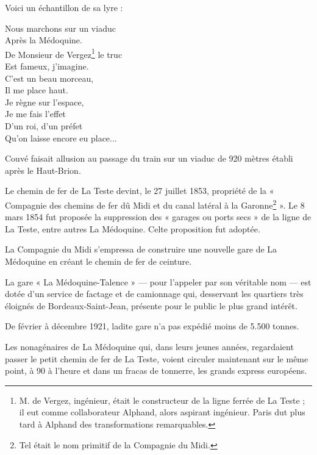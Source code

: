 \documentclass[a4paper,11pt]{book}
\begin{document}
Voici un échantillon de sa lyre :

\leftskip=3cm

\begin{small}
\noindent
Nous marchons sur un viaduc\\
Après la Médoquine.\\
De Monsieur de Vergez\footnote{M. de Vergez, ingénieur, était le constructeur de la ligne ferrée de La Teste ; il eut comme collaborateur Alphand, alors aspirant ingénieur. Paris dut plus tard à Alphand des transformations remarquables.} le truc\\
Est fameux, j'imagine.\\
C'est un beau morceau,\\
Il me place haut.\\
Je règne sur l'espace,\\
Je me fais l'effet\\
D'un roi, d'un préfet\\
Qu'on laisse encore eu place...\\
\end{small}

\leftskip=0cm

Couvé faisait allusion au passage du train sur un viaduc de 920 mètres établi après le Haut-Brion.

Le chemin de fer de La Teste devint, le 27 juillet 1853, propriété de la « Compagnie des chemins de fer dû Midi et du canal latéral à la Garonne\footnote{Tel était le nom primitif de la Compagnie du Midi.} ». Le 8 mars 1854 fut proposée la suppression des « garages ou ports secs » de la ligne de La Teste, entre autres La Médoquine. Celte
proposition fut adoptée.

La Compagnie du Midi s'empressa de construire une nouvelle gare de La Médoquine en créant le chemin de fer de ceinture.

La gare « La Médoquine-Talence » — pour l'appeler par son véritable nom — est dotée d'un service de factage et de camionnage qui, desservant les quartiers très éloignés de Bordeaux-Saint-Jean, présente pour le public le plus grand intérêt.

De février à décembre 1921, ladite gare n'a pas expédié moins de 5.500 tonnes.

Les nonagénaires de La Médoquine qui, dans leurs jeunes années, regardaient passer le petit chemin de fer de La Teste, voient circuler maintenant sur le même point, à
90 à l'heure et dans un fracas de tonnerre, les grands express européens.
\end{document}

